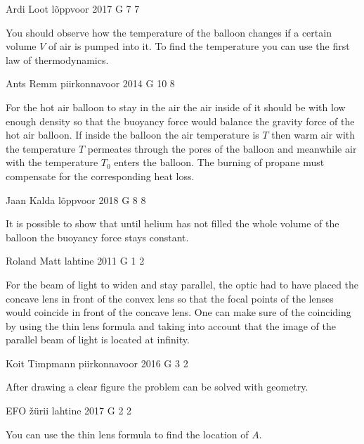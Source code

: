 \documentclass[11pt]{article}
\begin{document}
{Ardi Loot} %
{lõppvoor} %
{2017} %
{G 7} %
{7} %
{

\ifEngHint
You should observe how the temperature of the balloon changes if a certain volume $V$ of air is pumped into it. To find the temperature you can use the first law of thermodynamics.
\fi
}

{Ants Remm} %
{piirkonnavoor} %
{2014} %
{G 10} %
{8} %
{

\ifEngHint
For the hot air balloon to stay in the air the air inside of it should be with low enough density so that the buoyancy force would balance the gravity force of the hot air balloon. If inside the balloon the air temperature is $T$ then warm air with the temperature $T$ permeates through the pores of the balloon and meanwhile air with the temperature $T_0$ enters the balloon. The burning of propane must compensate for the corresponding heat loss.
\fi
}

{Jaan Kalda} %
{lõppvoor} %
{2018} %
{G 8} %
{8} %
{

\ifEngHint
It is possible to show that until helium has not filled the whole volume of the balloon the buoyancy force stays constant.
\fi
}

{Roland Matt} %
{lahtine} %
{2011} %
{G 1} %
{2} %
{

\ifEngHint
For the beam of light to widen and stay parallel, the optic had to have placed the concave lens in front of the convex lens so that the focal points of the lenses would coincide in front of the concave lens. One can make sure of the coinciding by using the thin lens formula and taking into account that the image of the parallel beam of light is located at infinity.
\fi
}

{Koit Timpmann} %
{piirkonnavoor} %
{2016} %
{G 3} %
{2} %
{

\ifEngHint
After drawing a clear figure the problem can be solved with geometry.
\fi
}

{EFO žürii} %
{lahtine} %
{2017} %
{G 2} %
{2} %
{

\ifEngHint
You can use the thin lens formula to find the location of $A$.
\fi
}
\end{document}
